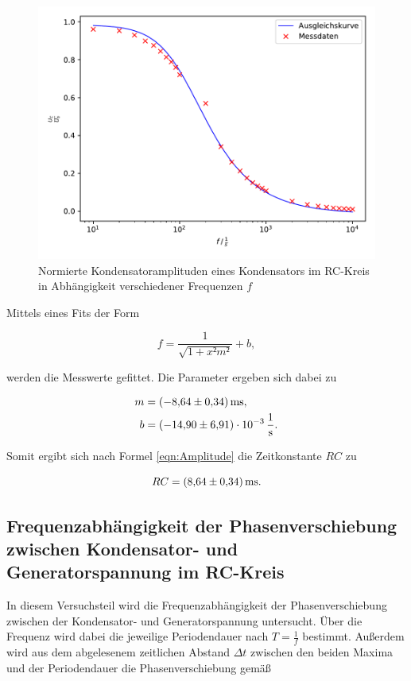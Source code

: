 \begin{figure}
  \centering
  \includegraphics[scale=0.8]{content/plot2.pdf}
  \caption{Normierte Kondensatoramplituden eines Kondensators im RC-Kreis in 
  Abhängigkeit verschiedener Frequenzen $f$}
  \label{fig:plot2}
\end{figure}

Mittels eines Fits der Form

\begin{equation*}
f = \frac{1}{\sqrt{1+x²m²}}+b,
\end{equation*}

werden die Messwerte gefittet. Die Parameter ergeben sich dabei zu

\begin{align*}
m &= \SI{-8.64+-0.34}{\milli\second},\\
b &= \SI{-14.90+-6.91e-3}{\per\second}.
\end{align*}

Somit ergibt sich nach Formel \eqref{eqn:Amplitude} die Zeitkonstante $RC$ zu

\begin{equation*}
RC = \SI{8.64+-0.34}{\milli\second}. 
\end{equation*}

\subsection{Frequenzabhängigkeit der Phasenverschiebung zwischen Kondensator- und 
Generatorspannung im RC-Kreis}

In diesem Versuchsteil wird die Frequenzabhängigkeit der Phasenverschiebung
zwischen der Kondensator- und Generatorspannung untersucht. Über die Frequenz 
wird dabei die jeweilige Periodendauer nach $T= \frac{1}{f}$ bestimmt. Außerdem
wird aus dem abgelesenem zeitlichen Abstand $\Delta t$ zwischen den beiden 
Maxima und der Periodendauer die Phasenverschiebung gemäß 

